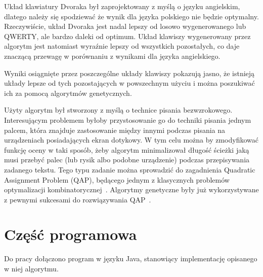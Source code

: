\documentclass[brudnopis]{xmgr}
\begin{document}
Układ klawiatury Dvoraka był zaprojektowany z myślą o języku angielskim, dlatego należy się spodziewać że wynik dla języka polskiego nie będzie optymalny. Rzeczywiście, układ Dvoraka jest nadal lepszy od losowo wygenerowanego lub QWERTY, ale bardzo daleki od optimum. Układ klawiszy wygenerowany przez algorytm jest natomiast wyraźnie lepszy od wszystkich pozostałych, co daje znaczącą przewagę w porównaniu z wynikami dla języka angielskiego.


\summary
Wyniki osiągnięte przez poszczególne układy klawiszy pokazują jasno, że istnieją układy lepsze od tych pozostających w powszechnym użyciu i można poszukiwać ich za pomocą algorytmów genetycznych.

Użyty algorytm był stworzony z myślą o technice pisania bezwzrokowego. Interesującym problemem byłoby przystosowanie go do techniki pisania jednym palcem, która znajduje zastosowanie między innymi podczas pisania na urządzeniach posiadających ekran dotykowy. W tym celu można by zmodyfikować funkcję oceny w taki sposób, żeby algorytm minimalizował długość ścieżki jaką musi przebyć palec (lub rysik albo podobne urządzenie) podczas przepisywania zadanego tekstu. Tego typu zadanie można sprowadzić do zagadnienia Quadratic Assignment Problem (QAP), będącego jednym z klasycznych problemów optymalizacji kombinatorycznej~\cite{Ji_asolution}. Algorytmy genetyczne były już wykorzystywane z pewnymi sukcesami do rozwiązywania QAP~\cite{Misevicius200465}.

\appendix
\chapter{Część programowa}

Do pracy dołączono program w języku Java, stanowiący implementację opisanego w niej algorytmu.




\listoftables

\listoffigures

\oswiadczenie
\end{document}
